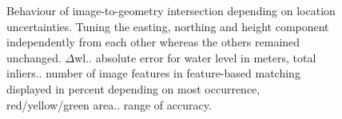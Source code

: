 \documentclass[review]{elsarticle}
\begin{document}
\begin{figure}[htbp!]
\begin{center}
	 	\begin{minipage}{\columnwidth}
	 		\centering
	 	\end{minipage}
	 	\begin{minipage}{\columnwidth}
	 		\centering
	 	\end{minipage}
	 	\begin{minipage}{\columnwidth}
	 		\centering
	 	\end{minipage}
	
	\caption{Behaviour of image-to-geometry intersection depending on location uncertainties. Tuning the easting, northing and height component independently from each other whereas the others remained unchanged. ${\Delta}$wl.. absolute error for water level in meters, total inliers.. number of image features in feature-based matching displayed in percent depending on most occurrence, red/yellow/green area.. range of accuracy.}
	\label{fig:sensor_sensi_location}
\end{center}
\end{figure}
\end{document}
